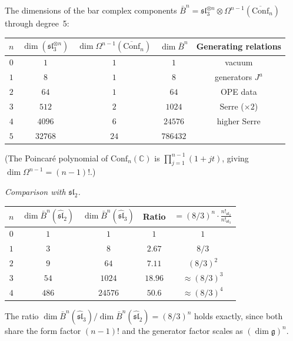 \begin{computation}
The dimensions of the bar complex components $\bar{B}^n = \mathfrak{sl}_3^{\otimes n}
\otimes \Omega^{n-1}(\overline{\mathrm{Conf}}_n)$ through degree~5:
\begin{center}
\renewcommand{\arraystretch}{1.2}
\begin{tabular}{c|ccc|c}
$n$ & $\dim(\mathfrak{sl}_3^{\otimes n})$ &
$\dim \Omega^{n-1}(\overline{\mathrm{Conf}}_n)$ &
$\dim \bar{B}^n$ & Generating relations \\
\hline
$0$ & $1$ & $1$ & $1$ & vacuum \\
$1$ & $8$ & $1$ & $8$ & generators $J^a$ \\
$2$ & $64$ & $1$ & $64$ & OPE data \\
$3$ & $512$ & $2$ & $1024$ & Serre ($\times 2$) \\
$4$ & $4096$ & $6$ & $24576$ & higher Serre \\
$5$ & $32768$ & $24$ & $786432$ &
\end{tabular}
\end{center}
(The Poincar\'{e} polynomial of $\mathrm{Conf}_n(\mathbb{C})$ is
$\prod_{j=1}^{n-1}(1+jt)$, giving $\dim \Omega^{n-1} = (n-1)!$.)

\emph{Comparison with $\mathfrak{sl}_2$.}
\begin{center}
\renewcommand{\arraystretch}{1.2}
\begin{tabular}{c|cc|cc}
$n$ & $\dim \bar{B}^n(\widehat{\mathfrak{sl}}_2)$ &
$\dim \bar{B}^n(\widehat{\mathfrak{sl}}_3)$ &
Ratio & $= (8/3)^n \cdot \tfrac{n!_{\mathfrak{sl}_2}}{n!_{\mathfrak{sl}_3}}$ \\
\hline
$0$ & $1$ & $1$ & $1$ & $1$ \\
$1$ & $3$ & $8$ & $2.67$ & $8/3$ \\
$2$ & $9$ & $64$ & $7.11$ & $(8/3)^2$ \\
$3$ & $54$ & $1024$ & $18.96$ & $\approx (8/3)^3$ \\
$4$ & $486$ & $24576$ & $50.6$ & $\approx (8/3)^4$
\end{tabular}
\end{center}
The ratio $\dim \bar{B}^n(\widehat{\mathfrak{sl}}_3) /
\dim \bar{B}^n(\widehat{\mathfrak{sl}}_2) = (8/3)^n$
holds exactly, since both share the form factor $(n-1)!$
and the generator factor scales as $(\dim \mathfrak{g})^n$.
\end{computation}


